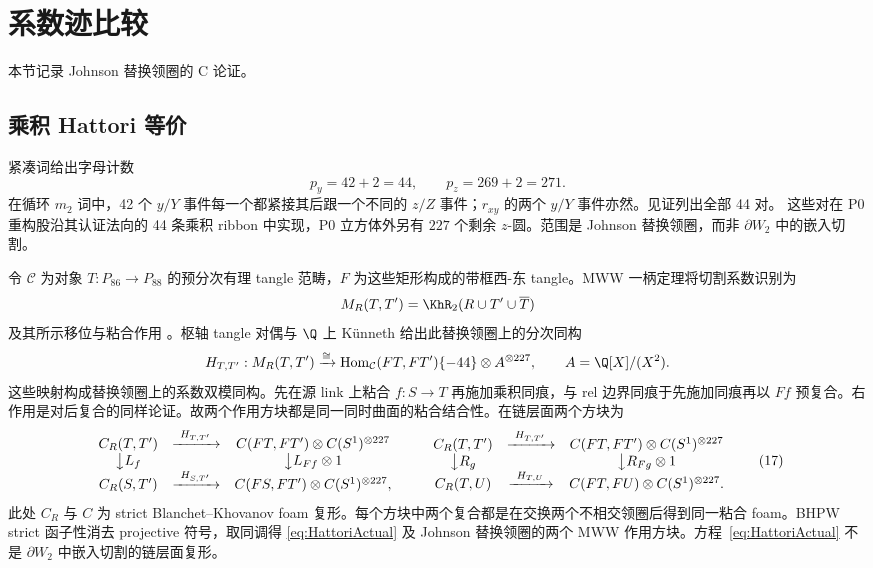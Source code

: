 \section{系数迹比较}\label{sec:c-comparison}

本节记录 Johnson 替换领圈的 C 论证。

\subsection{乘积 Hattori 等价}

紧凑词给出字母计数
\[
p_y=42+2=44,\qquad p_z=269+2=271.
\]
在循环 $m_2$ 词中，42 个 $y/Y$ 事件每一个都紧接其后跟一个不同的 $z/Z$ 事件；$r_{xy}$ 的两个 $y/Y$ 事件亦然。见证列出全部 44 对。
这些对在 P0 重构股沿其认证法向的 44 条乘积 ribbon 中实现，P0 立方体外另有 $227$ 个剩余 $z$-圆。范围是 Johnson 替换领圈，而非 $\partial W_2$ 中的嵌入切割。

令 $\mathcal C$ 为对象 $T:P_{86}\to P_{88}$ 的预分次有理 tangle 范畴，$F$ 为这些矩形构成的带框西-东 tangle。MWW 一柄定理将切割系数识别为
\[
M_R(T,T')=\KhR_2(R\cup T'\cup\overline T)
\]
及其所示移位与粘合作用
\cite[Theorem~4.7]{ManolescuWalkerWedrich2023}。枢轴 tangle 对偶与 $\Q$ 上 K\"unneth 给出此替换领圈上的分次同构
\begin{equation}\label{eq:HattoriActual}
H_{T,T'}:M_R(T,T')\xrightarrow{\cong}
\operatorname{Hom}_{\mathcal C}(FT,FT')\{-44\}
\otimes A^{\otimes227},
\qquad A=\Q[X]/(X^2).
\end{equation}
这些映射构成替换领圈上的系数双模同构。先在源 link 上粘合 $f:S\to T$ 再施加乘积同痕，与 rel 边界同痕于先施加同痕再以 $Ff$ 预复合。右作用是对后复合的同样论证。故两个作用方块都是同一同时曲面的粘合结合性。在链层面两个方块为
\[
\begin{array}{ccc}
C_R(T,T')&\xrightarrow{\ H_{T,T'}\ }&
C(FT,FT')\otimes C(S^1)^{\otimes227}\\
\big\downarrow {L_f}&&\big\downarrow {L_{Ff}\otimes1}\\
C_R(S,T')&\xrightarrow{\ H_{S,T'}\ }&
C(FS,FT')\otimes C(S^1)^{\otimes227},
\end{array}
\qquad
\begin{array}{ccc}
C_R(T,T')&\xrightarrow{\ H_{T,T'}\ }&
C(FT,FT')\otimes C(S^1)^{\otimes227}\\
\big\downarrow {R_g}&&\big\downarrow {R_{Fg}\otimes1}\\
C_R(T,U)&\xrightarrow{\ H_{T,U}\ }&
C(FT,FU)\otimes C(S^1)^{\otimes227}.
\end{array}
\tag{17}
\]
此处 $C_R$ 与 $C$ 为 strict Blanchet--Khovanov foam 复形。每个方块中两个复合都是在交换两个不相交领圈后得到同一粘合 foam。BHPW strict 函子性消去 projective 符号，取同调得 \eqref{eq:HattoriActual} 及 Johnson 替换领圈的两个 MWW 作用方块。方程~\eqref{eq:HattoriActual} 不是 $\partial W_2$ 中嵌入切割的链层面复形。

